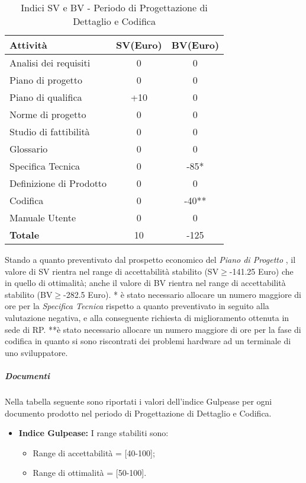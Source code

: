        
      \begin{table}[H]
        \centering
        \begin{tabular}{|l|c|c|}
          \hline
          \textbf{Attività} &\textbf{SV}(Euro)  &\textbf{BV}(Euro) \\
          \hline
          Analisi dei requisiti  &0 &0  \\
          Piano di progetto &0 &0\\
          Piano di qualifica  &+10  &0\\
          Norme di progetto &0  &0 \\
          Studio di fattibilità &0  &0  \\
          Glossario &0  &0  \\
          Specifica Tecnica &0 &-85*\\
          Definizione di Prodotto &0 &0\\
          Codifica &0 &-40**\\
          Manuale Utente &0 &0\\
          \hline
          \textbf{Totale} &10  &-125  \\
          \hline
        \end{tabular}
        \caption{Indici SV e BV - Periodo di Progettazione di Dettaglio e Codifica}
      \end{table}
      Stando a quanto preventivato dal prospetto economico del \emph{Piano di Progetto \VersionePP{}}, il valore di SV rientra nel range di accettabilità stabilito (SV\(\geq\)-141.25 Euro) che in quello di ottimalità;
      anche il valore di BV rientra nel range di accettabilità stabilito (BV\(\geq\)-282.5 Euro).
      * è stato necessario allocare un numero maggiore di ore per la \emph{Specifica Tecnica} rispetto a quanto preventivato in seguito alla valutazione negativa, e alla conseguente richiesta di miglioramento ottenuta in sede di RP.
      **è stato necessario allocare un numero maggiore di ore per la fase di codifica in quanto si sono riscontrati dei problemi hardware ad un terminale di uno sviluppatore.
      
      
      \subparagraph{Documenti}
      Nella tabella seguente sono riportati i valori dell'indice Gulpease per ogni documento prodotto nel periodo di Progettazione di Dettaglio e Codifica.\\

\begin{itemize}
\item \textbf{Indice Gulpease: }I range stabiliti sono:
      \begin{itemize}
        \item Range di accettabilità = [40-100];
        \item Range di ottimalità = [50-100].
      \end{itemize}
\end{itemize}      
      
